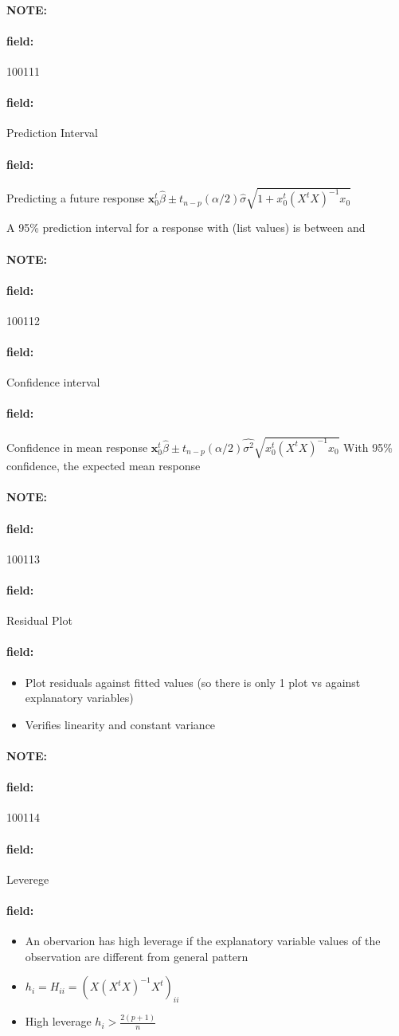\documentclass[12pt]{article}
\newenvironment{note}{\paragraph{NOTE:}}{}
\newenvironment{field}{\paragraph{field:}}{}
\begin{document}
\begin{note} \begin{field} \tiny 100111 \end{field}
 \begin{field}
  Prediction Interval
 \end{field}
 \begin{field}
  Predicting a future response
  $\mathbf{x}_0^t \hat{\beta} \pm t_{n-p}(\alpha/2)\hat{\sigma} \sqrt{1 + x_0^t(X^tX)^{-1}x_0}$

  A 95\% prediction interval for a response with (list values) is between and
 \end{field}
\end{note}



\begin{note} \begin{field} \tiny 100112 \end{field}
 \begin{field}
  Confidence interval
 \end{field}
 \begin{field}
  Confidence in mean response $\mathbf{x}_0^t \hat{\beta} \pm t_{n-p}(\alpha/2)\hat{\sigma^2} \sqrt{x_0^t(X^tX)^{-1}x_0}$
  With 95\% confidence, the expected mean response
 \end{field}
\end{note}


\begin{note} \begin{field} \tiny 100113 \end{field}
 \begin{field}
  Residual Plot
 \end{field}
 \begin{field}
  \begin{itemize}
   \item Plot residuals against fitted values (so there is only 1 plot vs against explanatory variables)
   \item Verifies linearity and constant variance
  \end{itemize}
 \end{field}
\end{note}

\begin{note} \begin{field} \tiny 100114 \end{field}
 \begin{field}
  Leverege
 \end{field}
 \begin{field}
  \begin{itemize}
   \item An obervarion has high leverage if the explanatory variable values of the observation are different from general pattern
   \item $h_i = H_{ii} = (X(X^tX)^{-1}X^t)_{ii}$
   \item High leverage $h_i > \frac{2(p+1)}{n}$
  \end{itemize}
 \end{field}
\end{note}
\end{document}
